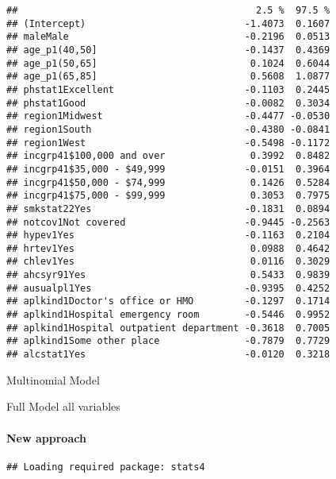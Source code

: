 \documentclass[]{article}
\newenvironment{Shaded}{\begin{snugshade}}{\end{snugshade}}
\newcommand{\CommentTok}[1]{\textcolor[rgb]{0.56,0.35,0.01}{\textit{#1}}}
\newcommand{\KeywordTok}[1]{\textcolor[rgb]{0.13,0.29,0.53}{\textbf{#1}}}
\newcommand{\NormalTok}[1]{#1}
\let\oldparagraph\paragraph
\renewcommand{\paragraph}[1]{\oldparagraph{#1}\mbox{}}
\begin{document}
\begin{verbatim}
##                                          2.5 %  97.5 %
## (Intercept)                            -1.4073  0.1607
## maleMale                               -0.2196  0.0513
## age_p1(40,50]                          -0.1437  0.4369
## age_p1(50,65]                           0.1024  0.6044
## age_p1(65,85]                           0.5608  1.0877
## phstat1Excellent                       -0.1103  0.2445
## phstat1Good                            -0.0082  0.3034
## region1Midwest                         -0.4477 -0.0530
## region1South                           -0.4380 -0.0841
## region1West                            -0.5498 -0.1172
## incgrp41$100,000 and over               0.3992  0.8482
## incgrp41$35,000 - $49,999              -0.0151  0.3964
## incgrp41$50,000 - $74,999               0.1426  0.5284
## incgrp41$75,000 - $99,999               0.3053  0.7975
## smkstat22Yes                           -0.1831  0.0894
## notcov1Not covered                     -0.9445 -0.2563
## hypev1Yes                              -0.1163  0.2104
## hrtev1Yes                               0.0988  0.4642
## chlev1Yes                               0.0116  0.3029
## ahcsyr91Yes                             0.5433  0.9839
## ausualpl1Yes                           -0.9395  0.4252
## aplkind1Doctor's office or HMO         -0.1297  0.1714
## aplkind1Hospital emergency room        -0.5446  0.9952
## aplkind1Hospital outpatient department -0.3618  0.7005
## aplkind1Some other place               -0.7879  0.7729
## alcstat1Yes                            -0.0120  0.3218
\end{verbatim}

Multinomial Model

Full Model all variables

\hypertarget{new-approach}{%
\paragraph{New approach}\label{new-approach}}

\begin{Shaded}
\end{Shaded}

\begin{verbatim}
## Loading required package: stats4
\end{verbatim}
\end{document}
